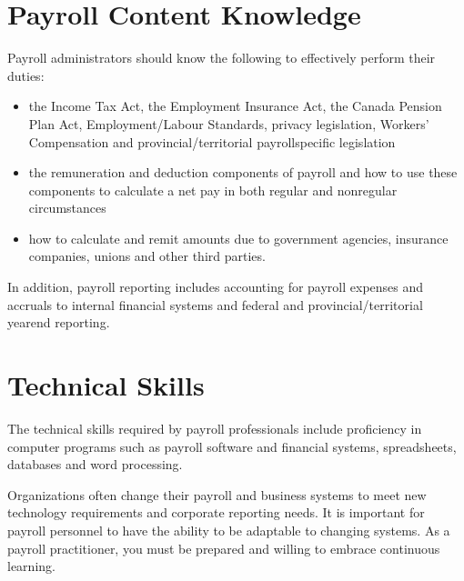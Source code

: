 \documentclass[letterpaper,10pt,english]{sphinxmanual}
\begin{document}
\section{Payroll Content Knowledge}
\label{\detokenize{1_introduction:payroll-content-knowledge}}
\sphinxAtStartPar
Payroll administrators should know the following to effectively perform
their duties:
\begin{itemize}
\item {} 
\sphinxAtStartPar
{} the Income Tax Act, the Employment Insurance Act, the Canada Pension Plan Act, Employment/Labour Standards, privacy legislation, Workers’ Compensation and provincial/territorial payroll\sphinxhyphen{}specific legislation

\item {} 
\sphinxAtStartPar
{} the remuneration and deduction components of payroll and how to use these components to calculate a net pay in both regular and non\sphinxhyphen{}regular circumstances

\item {} 
\sphinxAtStartPar
{} how to calculate and remit amounts due to government agencies, insurance companies, unions and other third parties.

\end{itemize}

\sphinxAtStartPar
In addition, payroll reporting includes accounting for payroll expenses and accruals to internal financial systems and federal and provincial/territorial year\sphinxhyphen{}end reporting.


\section{Technical Skills}
\label{\detokenize{1_introduction:technical-skills}}
\sphinxAtStartPar
The technical skills required by payroll professionals include proficiency in
computer programs such as payroll software and financial systems,
spreadsheets, databases and word processing.

\sphinxAtStartPar
Organizations often change their payroll and business systems to meet new
technology requirements and corporate reporting needs. It is important for
payroll personnel to have the ability to be adaptable to changing systems.
As a payroll practitioner, you must be prepared and willing to embrace
continuous learning.
\end{document}
